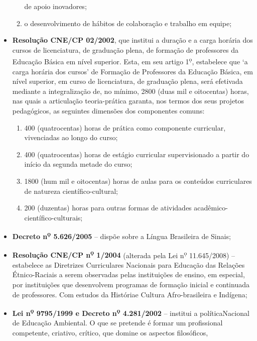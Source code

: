 \begin{itemize}[label=-]
\begin{enumerate}[label=\roman*.]
    de apoio inovadores;
  \item o desenvolvimento de h\'{a}bitos de colabora\c{c}\~{a}o e
    trabalho em equipe;
  \end{enumerate}
\item \textbf{Resolução CNE/CP 02/2002}, que institui a duração e a
  carga horária dos cursos de licenciatura, de graduação plena, de
  formação de professores da Educação Básica em nível superior. Esta,
  em seu artigo 1\textsuperscript{\d o}, estabelece que `a carga
  horária dos cursos' de Formação de Professores da Educação Básica,
  em nível superior, em curso de licenciatura, de graduação plena,
  será efetivada mediante a integralização de, no mínimo, 2800 (duas
  mil e oitocentas) horas, nas quais a articulação teoria-prática
  garanta, nos termos dos seus projetos pedagógicos, as seguintes
  dimensões dos componentes comuns:
  \begin{enumerate}[label=\roman*.]
  \item 400 (quatrocentas) horas de prática como componente
    curricular, vivenciadas ao longo do curso;
  \item 400 (quatrocentas) horas de est\'{a}gio curricular
    supervisionado a partir do in\'{i}cio da segunda metade do curso;
  \item 1800 (hum mil e oitocentas) horas de aulas para os
    conte\'{u}dos curriculares de natureza cient\'{i}fico-cultural;
  \item 200 (duzentas) horas para outras formas de atividades
    acad\^{e}mico-cient\'{i}fico-culturais;
  \end{enumerate}
\item \textbf{Decreto n\textsuperscript{\d o} 5.626/2005} --
  disp\~{o}e sobre a L\'{i}ngua Brasileira de Sinais;
\item \textbf{Resolução CNE/CP n\textsuperscript{\d o} 1/2004}
  (alterada pela Lei n\textsuperscript{\d o} 11.645/2008) --
  estabelece as Diretrizes Curriculares Nacionais para Educação das
  Relações Étnico-Raciais a serem observadas pelas instituições de
  ensino, em especial, por instituições que desenvolvem programas de
  formação inicial e continuada de professores.  Com estudos da
  Históriae Cultura Afro-brasileira e Indígena;
\item \textbf{Lei n\textsuperscript{\d o} 9795/1999 e Decreto
    n\textsuperscript{\d o} 4.281/2002} -- institui a políticaNacional
  de Educação Ambiental. O que se pretende é formar um profissional
  competente, criativo, crítico, que domine os aspectos filosóficos,

\end{itemize}

